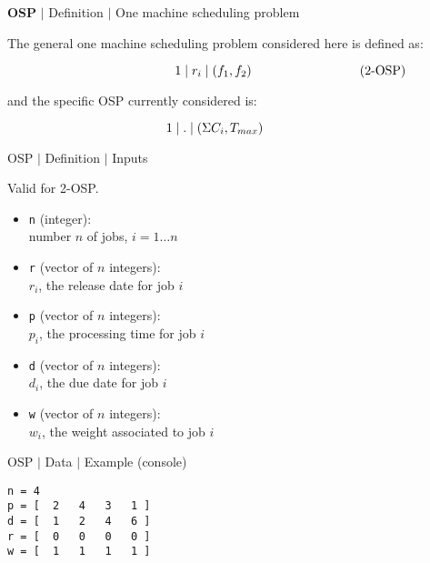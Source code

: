 %
% 

\begin{frame}{\textbf{OSP} $\mid$ Definition $\mid$ One machine scheduling problem}

The general one machine scheduling problem considered here is defined as:

$$ \hspace{30mm} 1\mid r_i \mid (f_1,f_2)  \hspace{30mm} \mbox{(2-OSP)}$$
\medskip 

and the specific OSP  currently considered is:

$$1\mid . \mid (\Sigma C_i,T_{max}) \hspace{12mm}$$

\end{frame}

%
% 
\begin{frame}{OSP $\mid$ Definition $\mid$ Inputs}

Valid for 2-OSP.
\bigskip
              \begin{itemize}
                \item \texttt{n} (integer): \\ number $n$ of jobs, $i=1\dots n$   
                                           \medskip
                \item \texttt{r} (vector of $n$  integers): \\   $r_{i}$,  the release date for job $i$                
                                           \medskip    
                \item \texttt{p} (vector of $n$  integers): \\   $p_{i}$, the processing time for job $i$         
                                           \medskip    
                \item \texttt{d} (vector of $n$  integers): \\  $d_{i}$, the due date for job $i$     
                                           \medskip
                \item \texttt{w} (vector of $n$  integers): \\  $w_{i}$, the weight associated to job $i$                              
              \end{itemize}
\end{frame}

%
% 
\begin{frame}[fragile=singleslide]{OSP $\mid$ Data $\mid$ Example (console)}

{\small
\begin{verbatim}
n = 4
p = [  2   4   3   1 ]
d = [  1   2   4   6 ]
r = [  0   0   0   0 ]
w = [  1   1   1   1 ]
\end{verbatim}
}

\end{frame}

